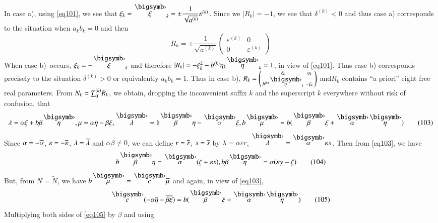 In case a), using \eqref{eq101}, we see that
$\xi_{k}=\overdot{\xi}_{k}=\pm
\dfrac{1}{\sqrt{a^{(k)}}}\varepsilon^{(k)}$. Since we $|R_{k}|=-1$, we
see that $\delta^{(k)}<0$ and thus case a) corresponds to the
situation when $a_{k}b_{k}=0$ and then
\begin{equation*}
R_{k}=\pm \frac{1}{\sqrt{a^{(k)}}}
\begin{pmatrix}
\varepsilon^{(k)} & 0\\
0 & \varepsilon^{(k)}
\end{pmatrix}\tag{102}\label{eq102}
\end{equation*}
When case b)~occurs, $\xi_{k}=-\overdot{\xi}_{k}$ and therefore
$|R_{k}|=-\xi^{2}_{k}-b^{(k)}\eta_{k}\overdot{\eta}_{k}=1$, in view of
\eqref{eq101}. Thus case b) corresponds precisely to the situation
$\delta^{(k)}>0$ or equivalently $a_{k}b_{k}=1$. Thus in case b),
$R_{k}=\left(\begin{smallmatrix} \xi_{k} &
  \eta_{k}\\ b^{(k)}\overdot{\eta}_{k} & -\xi_{k}
\end{smallmatrix}\right)$ and\pageoriginale $R_{k}$ contains ``a
priori'' eight free real parameters. From
$N_{k}=\underline{T}^{(k)}_{0}R_{k}$, we obtain, dropping the inconvenient
suffix $k$ and the superscript $k$ everywhere without risk of
confusion, that
\begin{equation*}
\lambda=\alpha\xi+b\beta\overdot{\eta},\mu=\alpha\eta-\beta\xi,
\overdot{\lambda}=\mathfrak{b}\overdot{\beta}\eta-\overdot{\alpha}\xi,
b\overdot{\mu}=b(\overdot{\beta}\xi+\overdot{\alpha}\overdot{\eta})\tag{103}\label{eq103}
\end{equation*}
Since $\alpha=-\overline{\alpha}$, $\varepsilon=-\overline{\varepsilon}$,
$\lambda=\overline{\lambda}$ and $\alpha\beta\neq 0$, we can define
$r=\overline{r}$, $s=\overline{s}$ by $\lambda=\alpha\varepsilon r$,
$\overdot{\lambda}=\overdot{\alpha}\varepsilon s$. Then from \eqref{eq103},
we have 
\begin{equation*}
b\overdot{\beta}\eta=\overdot{\alpha}(\xi+\varepsilon s),
b\beta\overdot{\eta}=\alpha(\varepsilon\gamma-\xi)\tag{104}\label{eq104}
\end{equation*}
But, from $N=\tilde{N}$, we have $b\overdot{\mu}=\overdot{c}\ob{\mu}$ and
again, in view of \eqref{eq103},
\begin{equation*}
\overdot{c}(-\alpha\ob{\eta}-\ob{\beta}\ob{\xi})=b(\overdot{\beta}\xi
+\overdot{\alpha}\overdot{\eta})\tag{105}\label{eq105} 
\end{equation*}
Multiplying both sides of \eqref{eq105} by $\beta$ and using

